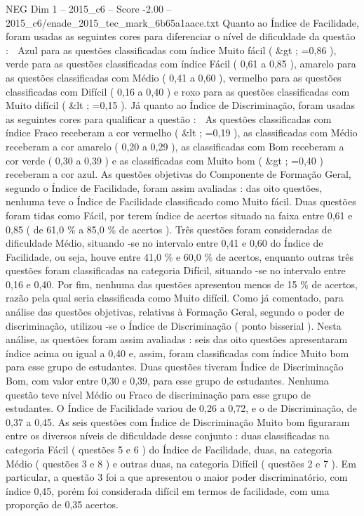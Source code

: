 \begin{textsample}{NEG Dim 1 – 2015\_c6 – Score -2.00 – 2015\_c6/enade\_2015\_tec\_mark\_6b65a1aace.txt}
Quanto ao Índice de Facilidade, foram usadas as seguintes cores para diferenciar o nível de dificuldade da questão :  Azul para as questões classificadas com índice Muito fácil ( \&gt ; =0,86 ), verde para as questões classificadas com índice Fácil ( 0,61 a 0,85 ), amarelo para as questões classificadas com Médio ( 0,41 a 0,60 ), vermelho para as questões classificadas com Difícil ( 0,16 a 0,40 ) e roxo para as questões classificadas com Muito difícil ( \&lt ; =0,15 ).
Já quanto ao Índice de Discriminação, foram usadas as seguintes cores para qualificar a questão :  As questões classificadas com índice Fraco receberam a cor vermelho ( \&lt ; =0,19 ), as classificadas com Médio receberam a cor amarelo ( 0,20 a 0,29 ), as classificadas com Bom receberam a cor verde ( 0,30 a 0,39 ) e as classificadas com Muito bom ( \&gt ; =0,40 ) receberam a cor azul.
As questões objetivas do Componente de Formação Geral, segundo o Índice de Facilidade, foram assim avaliadas : das oito questões, nenhuma teve o Índice de Facilidade classificado como Muito fácil.
Duas questões foram tidas como Fácil, por terem índice de acertos situado na faixa entre 0,61 e 0,85 ( de 61,0 \% a 85,0 \% de acertos ).
Três questões foram consideradas de dificuldade Médio, situando -se no intervalo entre 0,41 e 0,60 do Índice de Facilidade, ou seja, houve entre 41,0 \% e 60,0 \% de acertos, enquanto outras três questões foram classificadas na categoria Difícil, situando -se no intervalo entre 0,16 e 0,40.
Por fim, nenhuma das questões apresentou menos de 15 \% de acertos, razão pela qual seria classificada como Muito difícil.
Como já comentado, para análise das questões objetivas, relativas à Formação Geral, segundo o poder de discriminação, utilizou -se o Índice de Discriminação ( ponto bisserial ).
Nesta análise, as questões foram assim avaliadas : seis das oito questões apresentaram índice acima ou igual a 0,40 e, assim, foram classificadas com índice Muito bom para esse grupo de estudantes.
Duas questões tiveram Índice de Discriminação Bom, com valor entre 0,30 e 0,39, para esse grupo de estudantes.
Nenhuma questão teve nível Médio ou Fraco de discriminação para esse grupo de estudantes.
O Índice de Facilidade variou de 0,26 a 0,72, e o de Discriminação, de 0,37 a 0,45.
As seis questões com Índice de Discriminação Muito bom figuraram entre os diversos níveis de dificuldade desse conjunto : duas classificadas na categoria Fácil ( questões 5 e 6 ) do Índice de Facilidade, duas, na categoria Médio ( questões 3 e 8 ) e outras duas, na categoria Difícil ( questões 2 e 7 ).
Em particular, a questão 3 foi a que apresentou o maior poder discriminatório, com índice 0,45, porém foi considerada difícil em termos de facilidade, com uma proporção de 0,35 acertos.

\end{textsample}
